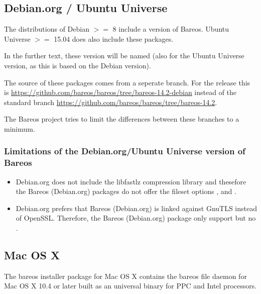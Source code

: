 \subsection{Debian.org / Ubuntu Universe}
\label{sec:DebianOrg}

The distributions of Debian $>=$ 8 include a version of Bareos.
Ubuntu Universe $>=$ 15.04 does also include these packages. 

In the further text, these version will be named  
(also for the Ubuntu Universe version, as this is based on the Debian version).

The source of these packages comes from a seperate branch.
For the release  this is
\url{https://github.com/bareos/bareos/tree/bareos-14.2-debian} instead of the standard branch \url{https://github.com/bareos/bareos/tree/bareos-14.2}.

The Bareos project tries to limit the differences between these branches to a minimum.

\subsubsection{Limitations of the Debian.org/Ubuntu Universe version of Bareos}
\label{sec:DebianOrgLimitations}

    \begin{itemize}
        \item Debian.org does not include the libfastlz compression library and thesefore the Bareos (Debian.org) packages do not offer the fileset options ,  and .
        \item Debian.org prefers that Bareos (Debian.org) is linked against GnuTLS instead of OpenSSL. Therefore, the Bareos (Debian.org) package only support  but no .
    \end{itemize}


\subsection{Mac OS X}
\label{sec:macosx}

The bareos installer package for Mac OS X contains the bareos file daemon for Mac OS X 10.4 or later built as an universal binary for PPC and Intel processors.

